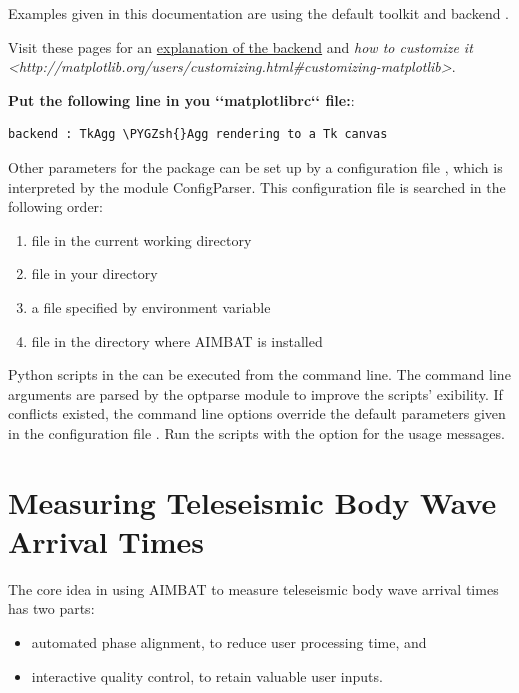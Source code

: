 \documentclass[letterpaper,10pt,english]{sphinxmanual}
\def\PYGZsh{\char`\#}
\begin{document}
Examples given in this documentation are using the default toolkit  and backend .

Visit these pages for an \href{http://matplotlib.org/faq/usage\_faq.html\#what-is-a-backend}{explanation of the backend} and \emph{how to customize it \textless{}http://matplotlib.org/users/customizing.html\#customizing-matplotlib\textgreater{}}.

\textbf{Put the following line in you {}`{}`matplotlibrc{}`{}` file:}:

\begin{Verbatim}[commandchars=\\\{\}]
backend : TkAgg \PYGZsh{}Agg rendering to a Tk canvas
\end{Verbatim}

Other parameters for the package can be set up by a configuration file , which is interpreted by the module ConfigParser. This configuration file is searched in the following order:
\begin{enumerate}
\item {} 
file  in the current working directory

\item {} 
file  in your  directory

\item {} 
a file specified by environment variable 

\item {} 
file  in the directory where AIMBAT is installed

\end{enumerate}

Python scripts in the  can be executed from the command line. The command line arguments are parsed by the optparse module to improve the scripts' exibility. If conflicts existed, the command line options override the default parameters given in the configuration file . Run the scripts with the  option for the usage messages.


\chapter{Measuring Teleseismic Body Wave Arrival Times}
\label{docfiles/PickingTravelTimes::doc}\label{docfiles/PickingTravelTimes:measuring-teleseismic-body-wave-arrival-times}
The core idea in using AIMBAT to measure teleseismic body wave arrival times has two parts:
\begin{itemize}
\item {} 
automated phase alignment, to reduce user processing time, and

\item {} 
interactive quality control, to retain valuable user inputs.

\end{itemize}
\end{document}
